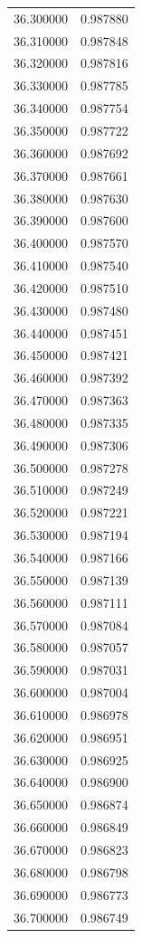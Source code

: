 \begin{tabular}{rr}
36.300000 & 0.987880 \\
36.310000 & 0.987848 \\
36.320000 & 0.987816 \\
36.330000 & 0.987785 \\
36.340000 & 0.987754 \\
36.350000 & 0.987722 \\
36.360000 & 0.987692 \\
36.370000 & 0.987661 \\
36.380000 & 0.987630 \\
36.390000 & 0.987600 \\
36.400000 & 0.987570 \\
36.410000 & 0.987540 \\
36.420000 & 0.987510 \\
36.430000 & 0.987480 \\
36.440000 & 0.987451 \\
36.450000 & 0.987421 \\
36.460000 & 0.987392 \\
36.470000 & 0.987363 \\
36.480000 & 0.987335 \\
36.490000 & 0.987306 \\
36.500000 & 0.987278 \\
36.510000 & 0.987249 \\
36.520000 & 0.987221 \\
36.530000 & 0.987194 \\
36.540000 & 0.987166 \\
36.550000 & 0.987139 \\
36.560000 & 0.987111 \\
36.570000 & 0.987084 \\
36.580000 & 0.987057 \\
36.590000 & 0.987031 \\
36.600000 & 0.987004 \\
36.610000 & 0.986978 \\
36.620000 & 0.986951 \\
36.630000 & 0.986925 \\
36.640000 & 0.986900 \\
36.650000 & 0.986874 \\
36.660000 & 0.986849 \\
36.670000 & 0.986823 \\
36.680000 & 0.986798 \\
36.690000 & 0.986773 \\
36.700000 & 0.986749 \\

\end{tabular}
